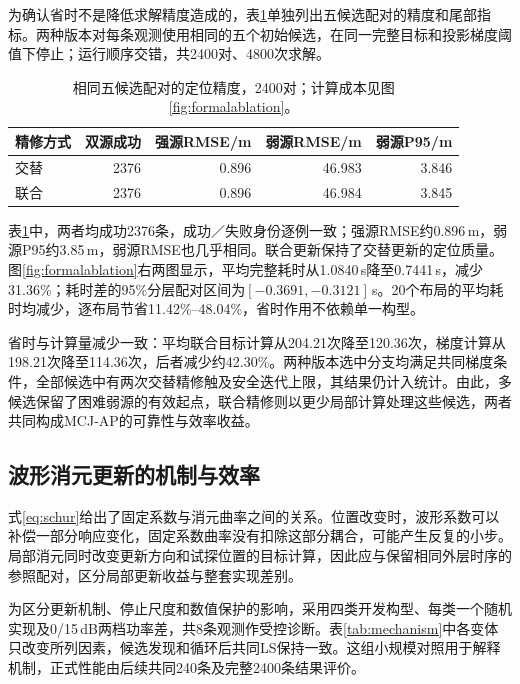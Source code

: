 \documentclass[a4paper,fleqn]{cas-sc}
\numberwithin{equation}{section}
\numberwithin{figure}{section}
\numberwithin{table}{section}
\begin{document}
为确认省时不是降低求解精度造成的，表\ref{tab:fivepair}单独列出五候选配对的精度和尾部指标。两种版本对每条观测使用相同的五个初始候选，在同一完整目标和投影梯度阈值下停止；运行顺序交错，共2400对、4800次求解。

\begin{table}[pos=H]\centering\small
\caption{相同五候选配对的定位精度，2400对；计算成本见图\ref{fig:formalablation}。}\label{tab:fivepair}
\begin{tabular}{@{}lrrrr@{}}\toprule
精修方式 & 双源成功 & 强源RMSE/m & 弱源RMSE/m & 弱源P95/m\\\midrule
交替 & 2376 & 0.896 & 46.983 & 3.846\\
联合 & 2376 & 0.896 & 46.984 & 3.845\\
\bottomrule\end{tabular}\end{table}


表\ref{tab:fivepair}中，两者均成功2376条，成功／失败身份逐例一致；强源RMSE约0.896\,m，弱源P95约3.85\,m，弱源RMSE也几乎相同。联合更新保持了交替更新的定位质量。图\ref{fig:formalablation}右两图显示，平均完整耗时从1.0840\,s降至0.7441\,s，减少31.36\%；耗时差的95\%分层配对区间为$[-0.3691,-0.3121]$\,s。20个布局的平均耗时均减少，逐布局节省11.42\%--48.04\%，省时作用不依赖单一构型。

省时与计算量减少一致：平均联合目标计算从204.21次降至120.36次，梯度计算从198.21次降至114.36次，后者减少约42.30\%。两种版本选中分支均满足共同梯度条件，全部候选中有两次交替精修触及安全迭代上限，其结果仍计入统计。由此，多候选保留了困难弱源的有效起点，联合精修则以更少局部计算处理这些候选，两者共同构成MCJ-AP的可靠性与效率收益。

\FloatBarrier
\subsection{波形消元更新的机制与效率}\label{sec:mechanismresults}
式\eqref{eq:schur}给出了固定系数与消元曲率之间的关系。位置改变时，波形系数可以补偿一部分响应变化，固定系数曲率没有扣除这部分耦合，可能产生反复的小步。局部消元同时改变更新方向和试探位置的目标计算，因此应与保留相同外层时序的参照配对，区分局部更新收益与整套实现差别。

为区分更新机制、停止尺度和数值保护的影响，采用四类开发构型、每类一个随机实现及0/15\,dB两档功率差，共8条观测作受控诊断。表\ref{tab:mechanism}中各变体只改变所列因素，候选发现和循环后共同LS保持一致。这组小规模对照用于解释机制，正式性能由后续共同240条及完整2400条结果评价。
\end{document}

